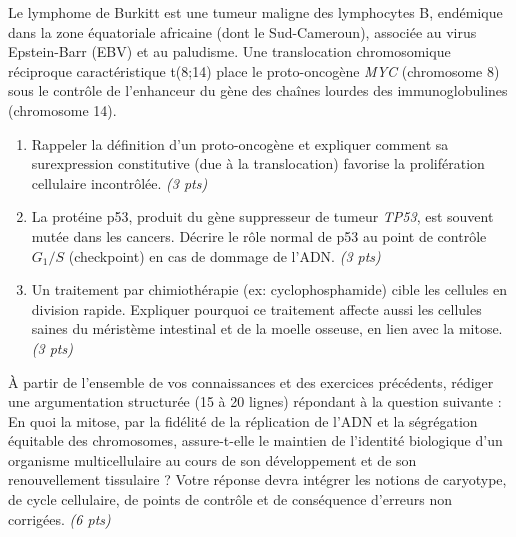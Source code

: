 \documentclass[11pt]{article}
\begin{document}
\begin{exercice}
Le lymphome de Burkitt est une tumeur maligne des lymphocytes B, endémique dans la zone équatoriale africaine (dont le Sud-Cameroun), associée au virus Epstein-Barr (EBV) et au paludisme. Une translocation chromosomique réciproque caractéristique t(8;14) place le proto-oncogène \textit{MYC} (chromosome 8) sous le contrôle de l'enhanceur du gène des chaînes lourdes des immunoglobulines (chromosome 14).
\begin{enumerate}
    \item Rappeler la définition d'un proto-oncogène et expliquer comment sa surexpression constitutive (due à la translocation) favorise la prolifération cellulaire incontrôlée. \textit{(3 pts)}
    \item La protéine p53, produit du gène suppresseur de tumeur \textit{TP53}, est souvent mutée dans les cancers. Décrire le rôle normal de p53 au point de contrôle $G_1/S$ (checkpoint) en cas de dommage de l'ADN. \textit{(3 pts)}
    \item Un traitement par chimiothérapie (ex: cyclophosphamide) cible les cellules en division rapide. Expliquer pourquoi ce traitement affecte aussi les cellules saines du méristème intestinal et de la moelle osseuse, en lien avec la mitose. \textit{(3 pts)}
\end{enumerate}
\end{exercice}

\begin{exercice}
À partir de l'ensemble de vos connaissances et des exercices précédents, rédiger une argumentation structurée (15 à 20 lignes) répondant à la question suivante : \og En quoi la mitose, par la fidélité de la réplication de l'ADN et la ségrégation équitable des chromosomes, assure-t-elle le maintien de l'identité biologique d'un organisme multicellulaire au cours de son développement et de son renouvellement tissulaire ? \fg
Votre réponse devra intégrer les notions de caryotype, de cycle cellulaire, de points de contrôle et de conséquence d'erreurs non corrigées. \textit{(6 pts)}
\end{exercice}
\end{document}
